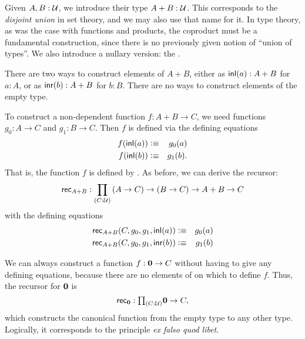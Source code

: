 Given $A,B:\mathcal{U}$, we introduce their  type $A+B:\mathcal{U}$.
%
%
%
%
%
%
This corresponds to the \emph{disjoint union} in set theory, and we may also use that name for it.
In type theory, as was the case with functions and products, the coproduct must be a fundamental construction, since there is no previously given notion of ``union of types''.
We also introduce a
nullary version: the .
%
%

There are two ways to construct elements of $A+B$, either as ${\mathsf{inl}}(a) : A+B$ for $a:A$, or as
${\mathsf{inr}}(b):A+B$ for $b:B$. There are no ways to construct elements of the empty type. 

To construct a non-dependent function $f : A+B \to C$, we need 
functions $g_0 : A \to C$ and $g_1 : B \to C$. Then $f$ is defined
via the defining equations
\begin{eqnarray*}
  f({\mathsf{inl}}(a)) & \vcentcolon\equiv & g_0(a) \\
  f({\mathsf{inl}}(b)) & \vcentcolon\equiv & g_1(b).
\end{eqnarray*}
That is, the function $f$ is defined by .
%
As before, we can derive the recursor:
%
\[ \rec{A+B} : \dprd{C:\UU}(A \to C) \to (B\to C) \to A+B \to C\]
with the defining equations
\begin{eqnarray*}
\mathsf{rec}_{A+B}(C,g_0,g_1,{\mathsf{inl}}(a)) & \vcentcolon\equiv & g_0(a) \\
\mathsf{rec}_{A+B}(C,g_0,g_1,{\mathsf{inr}}(b)) & \vcentcolon\equiv & g_1(b)
\end{eqnarray*}

We can always construct a function $f : \mathbf{0} \to C$ without
having to give any defining equations, because there are no elements of \emptyt on which to define $f$.
Thus, the recursor for $\mathbf{0}$ is
\[\rec{\emptyt} : \tprd{C:\UU} \emptyt \to C,\]
which constructs the canonical function from the empty type to any other type.
Logically, it corresponds to the principle \emph{ex falso quod libet}. 

